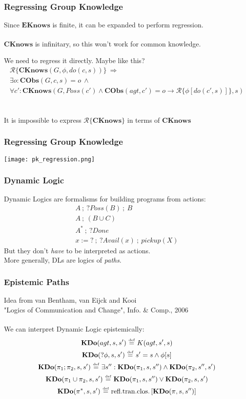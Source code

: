 \documentclass{beamer}
\newcommand{\isdef}{\hbox{$\stackrel{\mbox{\tiny def}}{=}$}}
\begin{document}
\begin{frame}
\frametitle{Regressing Group Knowledge}
Since $\mathbf{EKnows}$ is finite, it can be expanded to perform regression.
\ \\
\ \\
$\mathbf{CKnows}$ is infinitary, so this won't work for common knowledge.

We need to regress it directly.  Maybe like this?
\begin{multline*}
\mathcal{R}\{\mathbf{CKnows}(G,\phi,do(c,s))\}\ \Rightarrow \\
\exists o: \mathbf{CObs}(G,c,s)=o\ \wedge\\
\forall c': \mathbf{CKnows}(G,Poss(c') \wedge \mathbf{CObs}(agt,c')=o \rightarrow \mathcal{R}\{\phi[do(c',s)]\},s)
\end{multline*}
\ \\
\ \\
\pause
It is \alert{impossible} to express $\mathcal{R}\{\mathbf{CKnows}\}$ in terms of $\mathbf{CKnows}$
\end{frame}

\begin{frame}
\frametitle{Regressing Group Knowledge}
\begin{center}
  \texttt{[image: pk\_regression.png]}
\end{center}
\end{frame}

\begin{frame}
\frametitle{Dynamic Logic}
Dynamic Logics are formalisms for building programs from actions:
\begin{gather*}
A\ ;\ ?Poss(B)\ ;\ B \\
A\ ;\ (B \cup C) \\
A^*\ ;\ ?Done \\
x:=?\ ;\ ?Avail(x)\ ;\ pickup(X)
\end{gather*}
But they don't \emph{have} to be interpreted as actions.\\
More generally, DLs are logics of \emph{paths}.
\end{frame}

\begin{frame}
\frametitle{Epistemic Paths}
Idea from van Bentham, van Eijck and Kooi\\
"Logics of Communication and Change", Info. \& Comp., 2006
\ \\
\ \\
We can interpret Dynamic Logic epistemically:
\begin{gather*}
\mathbf{KDo}(agt,s,s')\ \isdef\ K(agt,s',s)\\
\mathbf{KDo}(?\phi,s,s')\ \isdef\ s'=s \wedge \phi[s]\\
\mathbf{KDo}(\pi_1;\pi_2,s,s')\ \isdef\ \exists s'': \mathbf{KDo}(\pi_1,s,s'') \wedge \mathbf{KDo}(\pi_2,s'',s')\\
\mathbf{KDo}(\pi_1\cup\pi_2,s,s')\ \isdef\ \mathbf{KDo}(\pi_1,s,s'') \vee \mathbf{KDo}(\pi_2,s,s')\\
\mathbf{KDo}(\pi^*,s,s')\ \isdef\ \mathrm{refl. tran. clos.}\left[\mathbf{KDo}(\pi,s,s'')\right]\\
\end{gather*}
\end{frame}
\end{document}
